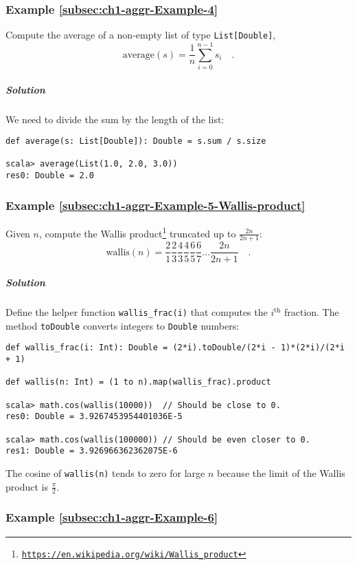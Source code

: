 \subsubsection{Example \label{subsec:ch1-aggr-Example-4}\ref{subsec:ch1-aggr-Example-4}}

Compute the average of a non-empty list of type \lstinline!List[Double]!,
\[
\text{average}\left(s\right)=\frac{1}{n}\sum_{i=0}^{n-1}s_{i}\quad.
\]


\subparagraph{Solution}

We need to divide the sum by the length of the list:
\begin{lstlisting}
def average(s: List[Double]): Double = s.sum / s.size

scala> average(List(1.0, 2.0, 3.0))
res0: Double = 2.0
\end{lstlisting}


\subsubsection{Example \label{subsec:ch1-aggr-Example-5-Wallis-product}\ref{subsec:ch1-aggr-Example-5-Wallis-product}}

Given $n$, compute the Wallis product\footnote{\texttt{\href{https://en.wikipedia.org/wiki/Wallis_product}{https://en.wikipedia.org/wiki/Wallis\_product}}}
truncated up to $\frac{2n}{2n+1}$: 
\[
\text{wallis}\left(n\right)=\frac{2}{1}\frac{2}{3}\frac{4}{3}\frac{4}{5}\frac{6}{5}\frac{6}{7}...\frac{2n}{2n+1}\quad.
\]


\subparagraph{Solution}

Define the helper function \lstinline!wallis_frac(i)! that computes
the $i^{\text{th}}$ fraction. The method \texttt{}\lstinline!toDouble!
converts integers to \texttt{}\lstinline!Double! numbers:
\begin{lstlisting}
def wallis_frac(i: Int): Double = (2*i).toDouble/(2*i - 1)*(2*i)/(2*i + 1)

def wallis(n: Int) = (1 to n).map(wallis_frac).product

scala> math.cos(wallis(10000))  // Should be close to 0.
res0: Double = 3.9267453954401036E-5

scala> math.cos(wallis(100000)) // Should be even closer to 0.
res1: Double = 3.926966362362075E-6
\end{lstlisting}
The cosine of \lstinline!wallis(n)! tends to zero for large $n$
because the limit of the Wallis product is $\frac{\pi}{2}$.

\subsubsection{Example \label{subsec:ch1-aggr-Example-6}\ref{subsec:ch1-aggr-Example-6}}


